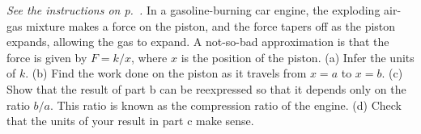 \emph{See the instructions on p.~\pageref{hw:longbow}.} In a gasoline-burning car engine, the exploding air-gas
mixture makes a force on the piston, and the force tapers off as the piston expands, allowing the
gas to expand.
A not-so-bad approximation is that the force is given by $F=k/x$,
where $x$ is the position of the piston.
(a) Infer the units of $k$.
(b) Find the
work done on the piston as it travels from $x=a$ to $x=b$.
(c) Show that the result of part b can be reexpressed so that it depends only
on the ratio $b/a$. This ratio is known as the compression ratio of the engine.
(d) Check that the units of your result in part c make sense.
